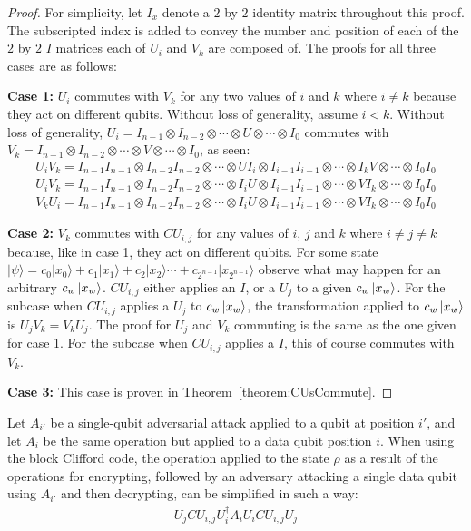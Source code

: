 \begin{proof}
For simplicity, let $I_x$ denote a $2$ by $2$ identity matrix throughout this proof. The subscripted index is added to convey the number and position of each of the $2$ by $2$ $I$ matrices each of $U_i$ and $V_k$ are composed of. The proofs for all three cases are as follows:

\textbf{Case 1:} $U_i$ commutes with $V_k$ for any two values of $i$ and $k$ where $i \neq k$ because they act on different qubits. Without loss of generality, assume $i < k$. Without loss of generality, $U_i = I_{n-1} \otimes I_{n-2} \otimes \cdots \otimes U \otimes \cdots \otimes I_0$ commutes with $V_k = I_{n-1} \otimes I_{n-2} \otimes \cdots \otimes V \otimes \cdots \otimes I_0$, as seen:
\begin{align}
U_iV_k = I_{n-1}I_{n-1} \otimes I_{n-2}I_{n-2} \otimes \cdots \otimes UI_i \otimes I_{i-1}I_{i-1} \otimes \cdots \otimes I_kV \otimes \cdots \otimes I_0I_0\\
U_iV_k = I_{n-1}I_{n-1} \otimes I_{n-2}I_{n-2} \otimes \cdots \otimes I_iU \otimes I_{i-1}I_{i-1} \otimes \cdots \otimes VI_k \otimes \cdots \otimes I_0I_0\\
V_kU_i = I_{n-1}I_{n-1} \otimes I_{n-2}I_{n-2} \otimes \cdots \otimes I_iU \otimes I_{i-1}I_{i-1} \otimes \cdots \otimes VI_k \otimes \cdots \otimes I_0I_0
\end{align}

\textbf{Case 2:} $V_k$ commutes with $\mathit{CU}_{i,j}$ for any values of $i$, $j$ and $k$ where $i \neq j \neq k$ because, like in case 1, they act on different qubits. For some state $|\psi\rangle = c_0|x_0\rangle + c_1|x_1\rangle + c_2|x_2\rangle \cdots + c_{2^{n-1}}|x_{2^{n-1}}\rangle$ observe what may happen for an arbitrary $c_w\ket{x_w}$. $\mathit{CU}_{i,j}$ either applies an $I$, or a $U_j$ to a given $c_w\ket{x_w}$. For the subcase when $\mathit{CU}_{i,j}$ applies a $U_j$ to $c_w\ket{x_w}$, the transformation applied to $c_w\ket{x_w}$ is $U_jV_k = V_kU_j$. The proof for $U_j$ and $V_k$ commuting is the same as the one given for case 1. For the subcase when $\mathit{CU}_{i,j}$ applies a $I$, this of course commutes with $V_k$.

\textbf{Case 3:} This case is proven in Theorem~\ref{theorem:CUsCommute}.
\end{proof}
\begin{myLemmarep}
\label{lemma:integrityEncryptionRearrangement}
Let $A_{i'}$ be a single-qubit adversarial attack applied to a qubit at position $i'$, and let $A_i$ be the same operation but applied to a data qubit position $i$. When using the block Clifford code, the operation applied to the state $\rho$ as a result of the operations for encrypting, followed by an adversary attacking a single data qubit using $A_{i'}$ and then decrypting, can be simplified in such a way:
\begin{align}
U_{j} \mathit{CU}_{i,j}U_i^{\dagger}A_{i}U_i\mathit{CU}_{i,j} U_{j} \label{eq:integrityEncryptionRearrangement}
\end{align}
\end{myLemmarep}
